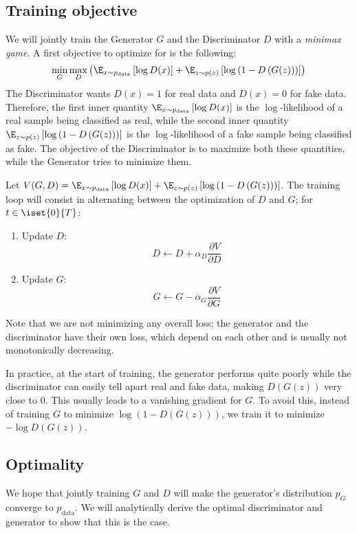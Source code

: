 \subsection{Training objective}
We will jointly train the Generator $G$ and the Discriminator $D$ with a \emph{minimax game}. A first objective to optimize for is the following:
\begin{equation}
    \min_G\max_D \left(
        \E_{x\sim p_{\text{data}}}\left[\log D(x)\right] + \E_{z\sim p(z)}\left[\log\left(1-D\left(G(z)\right)\right)\right]
    \right)
\end{equation}
The Discriminator wants $D(x)=1$ for real data and $D(x)=0$ for fake data. Therefore, the first inner quantity $\E_{x\sim p_{\text{data}}}\left[\log D(x)\right]$ is the $\log$-likelihood of a real sample being classified as real, while the second inner quantity $\E_{z\sim p(z)}\left[\log\left(1-D\left(G(z)\right)\right)\right]$ is the $\log$-likelihood of a fake sample being classified as fake. The objective of the Discriminator is to maximize both these quantities, while the Generator tries to minimize them.

Let $V(G, D) = \E_{x\sim p_{\text{data}}}\left[\log D(x)\right] + \E_{z\sim p(z)}\left[\log\left(1-D\left(G(z)\right)\right)\right]$. The training loop will consist in alternating between the optimization of $D$ and $G$; for $t\in\iset{0}{T}$:
\begin{enumerate}
    \item Update $D$: \begin{equation*}D\longleftarrow D+\alpha_D\frac{\partial V}{\partial D}\end{equation*}
    \item Update $G$: \begin{equation*}G\longleftarrow G-\alpha_G\frac{\partial V}{\partial G}\end{equation*}
\end{enumerate}
Note that we are not minimizing any overall loss; the generator and the discriminator have their own loss, which depend on each other and is usually not monotonically decreasing.

In practice, at the start of training, the generator performs quite poorly while the discriminator can easily tell apart real and fake data, making $D(G(z))$ very close to $0$. This usually leads to a vanishing gradient for $G$. To avoid this, instead of training $G$ to minimize $\log\left(1-D(G(z))\right)$, we train it to minimize $-\log D(G(z))$.

\subsection{Optimality}
We hope that jointly training $G$ and $D$ will make the generator's distribution $p_G$ converge to $p_{\text{data}}$. We will analytically derive the optimal discriminator and generator to show that this is the case.

